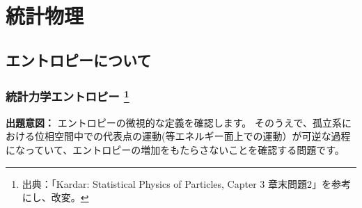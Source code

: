 \documentclass[uplatex,dvipdfmx,a4paper,11pt]{jsarticle}
\begin{document}
\newpage


\section{統計物理}

\subsection{エントロピーについて}


\subsubsection[統計力学エントロピー]{統計力学エントロピー \protect \footnote{出典：「Kardar: Statistical Physics of Particles, Capter 3 章末問題2」を参考にし、改変。}}


\begin{boxnote}
{\bf 出題意図：}
エントロピーの微視的な定義を確認します。
そのうえで、孤立系における位相空間中での代表点の運動(等エネルギー面上での運動）が可逆な過程になっていて、エントロピーの増加をもたらさないことを確認する問題です。
\end{boxnote}

\vspace{8pt}
\end{document}
